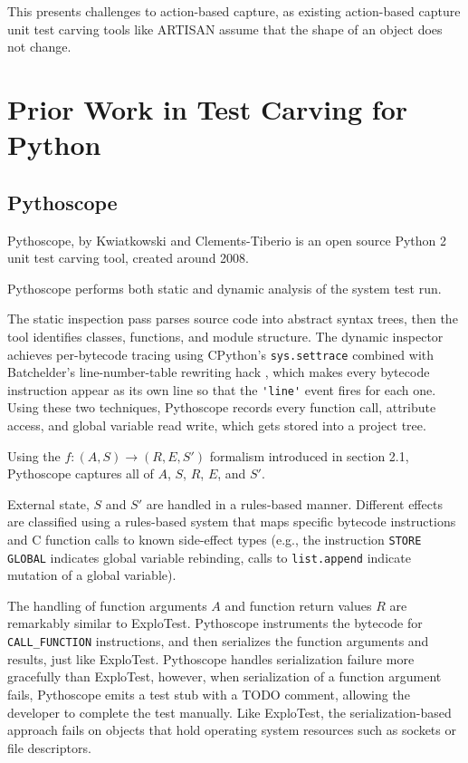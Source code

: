 This presents challenges to action-based capture, as existing action-based capture unit test carving tools
like ARTISAN \cite{gambi2023action} assume
that the shape of an object does not change.

\section{Prior Work in Test Carving for Python}
\subsection{Pythoscope}

Pythoscope, by Kwiatkowski and Clements-Tiberio \cite*{pythoscopewikidot,pythoscopegithub,l2011capture} is an
open source Python 2 unit test
carving tool, created around 2008.

Pythoscope performs both static and dynamic analysis of the system test run.

The static inspection pass parses source code into abstract syntax trees, then the tool identifies classes, functions,
and module structure. The dynamic inspector achieves per-bytecode tracing using CPython's \verb|sys.settrace|
combined with Batchelder's line-number-table rewriting hack \cite{batchelder2008bytecode}, which makes every
bytecode instruction appear as its own line so that the \verb|'line'| event fires for each one.
Using these two techniques, Pythoscope records every function call, attribute access, and global variable read write, which
gets stored into a project tree.

Using the $f : (A, S) \rightarrow (R, E, S')$ formalism introduced in section 2.1, Pythoscope captures all
of $A$, $S$, $R$, $E$, and $S'$.

External state, $S$ and $S'$ are handled in a rules-based manner. Different effects are classified using a rules-based system that
maps specific bytecode instructions and C function calls to known side-effect types (e.g., the instruction \verb|STORE GLOBAL| indicates
global variable rebinding, calls to \verb|list.append| indicate mutation of a global variable).

The handling of function arguments $A$ and function return values $R$ are remarkably similar to ExploTest. Pythoscope instruments
the bytecode for \verb|CALL_FUNCTION| instructions, and then serializes the function arguments and results, just like ExploTest.
Pythoscope handles serialization failure more gracefully than ExploTest, however, when serialization of a function argument fails,
Pythoscope emits a test stub with a TODO comment, allowing the developer to complete the test manually. Like ExploTest, the
serialization-based approach fails on objects that hold operating system resources such as sockets or file descriptors.

